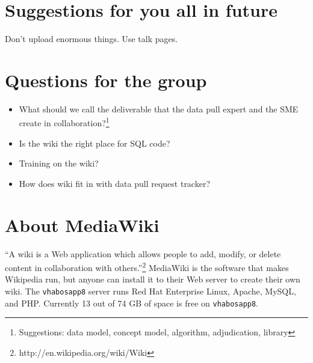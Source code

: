\documentclass{tufte-handout}
\begin{document}
\section{Suggestions for you all in future}

Don't upload enormous things. Use talk pages. 

\section{Questions for the group}

\begin{itemize}

\item What should we call the deliverable that the data pull expert
  and the SME create in collaboration?\footnote{Suggestions: data
    model, concept model, algorithm, adjudication, library}

\item Is the wiki the right place for SQL code?

\item Training on the wiki?

\item How does wiki fit in with data pull request tracker?

\end{itemize}

\section{About MediaWiki}

``A wiki is a Web application which allows people to add, modify, or
delete content in collaboration with
others.''\footnote{http://en.wikipedia.org/wiki/Wiki} MediaWiki is the
software that makes Wikipedia run, but anyone can install it to their
Web server to create their own wiki. The \texttt{vhabosapp8} server
runs Red Hat Enterprise Linux, Apache, MySQL, and PHP. Currently 13
out of 74 GB of space is free on \texttt{vhabosapp8}.
\end{document}

